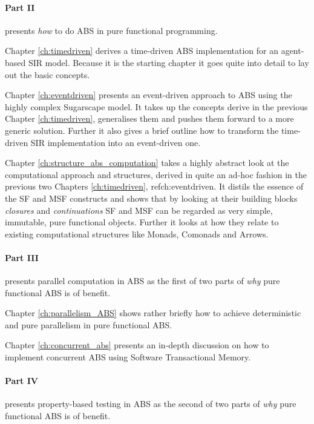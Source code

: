 \paragraph{Part II} presents \textit{how} to do ABS in pure functional programming. 
\medskip

Chapter \ref{ch:timedriven} derives a time-driven ABS implementation for an agent-based SIR model. Because it is the starting chapter it goes quite into detail to lay out the basic concepts.

\medskip

Chapter \ref{ch:eventdriven} presents an event-driven approach to ABS using the highly complex Sugarscape model. It takes up the concepts derive in the previous Chapter \ref{ch:timedriven}, generalises them and pushes them forward to a more generic solution. Further it also gives a brief outline how to transform the time-driven SIR implementation into an event-driven one.

\medskip

Chapter \ref{ch:structure_abs_computation} takes a highly abstract look at the computational approach and structures, derived in quite an ad-hoc fashion in the previous two Chapters \ref{ch:timedriven}, ref{ch:eventdriven}. It distils the essence of the SF and MSF constructs and shows that by looking at their building blocks \textit{closures} and \textit{continuations} SF and MSF can be regarded as very simple, immutable, pure functional objects. Further it looks at how they relate to existing computational structures like Monads, Comonads and Arrows.

\medskip

\paragraph{Part III} presents parallel computation in ABS as the first of two parts of \textit{why} pure functional ABS is of benefit.
\medskip

Chapter \ref{ch:parallelism_ABS} shows rather briefly how to achieve deterministic and pure parallelism in pure functional ABS. 

\medskip

Chapter \ref{ch:concurrent_abs} presents an in-depth discussion on how to implement concurrent ABS using Software Transactional Memory.

\medskip

\paragraph{Part IV} presents property-based testing in ABS as the second of two parts of \textit{why} pure functional ABS is of benefit.
\medskip

